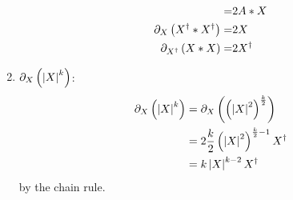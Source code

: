 \begin{enumerate}
\begin{align}
		                                  =& 2A*X \nonumber \\
		\partial_{X}\left ( {X^{\dagger}*X^{\dagger}} \right ) =&  2X \label{eq6_50a}\\
		\partial_{X^{\dagger}}\left ( {X*X} \right ) =&  2X^{\dagger} \label{eq6_51a}
	\end{align}
\item $\partial_{X}\left ( {\left | {X} \right |^{k}} \right )$:
	\begin{align}
 \partial_{X}\left ( {\left | {X} \right |^{k}} \right ) &=  \partial_{X}\left ( {\left ( {\left | {X} \right |^{2}} \right )^{\frac{k}{2}}} \right ) \nonumber \\
                                 &= 2\displaystyle\frac{k}{2}\left ( {\left | {X} \right |^{2}} \right )^{\frac{k}{2}-1}X^{\dagger} \nonumber \\
                                 &= k\left | {X} \right |^{k-2}X^{\dagger}  \label{eq6_52a}
	\end{align}
	by the chain rule.
\end{enumerate}

